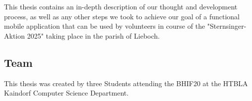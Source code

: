 \blankLine

This thesis contains an in-depth description of our thought and development
process, as well as any other steps we took to achieve our goal of a
functional mobile application that can be used by volunteers in course of the
"Sternsinger-Aktion 2025" taking place in the parish of Lieboch.

\newpage

\subsection{Team}


This thesis was created by three Students attending the BHIF20 at the
HTBLA Kaindorf Computer Science Department.

\blankLine


